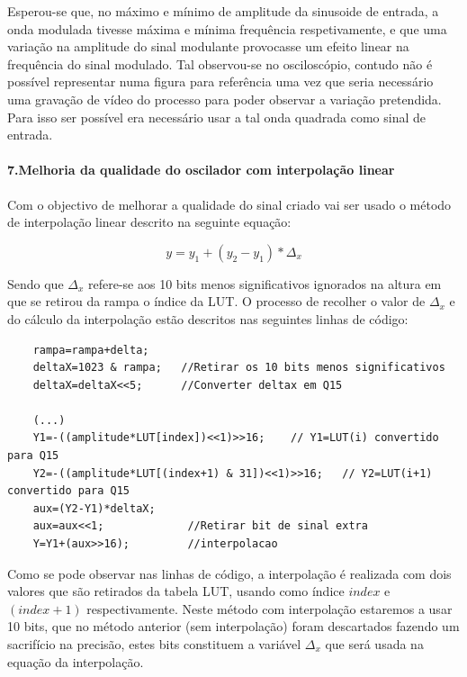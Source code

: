 \documentclass[11pt]{article}
\numberwithin{equation}{section}
\begin{document}
Esperou-se que, no máximo e mínimo de amplitude da sinusoide de entrada, a onda modulada tivesse máxima e mínima frequência respetivamente, e que uma variação na amplitude do sinal modulante provocasse um efeito linear na frequência do sinal modulado. Tal observou-se no osciloscópio, contudo não é possível representar numa figura para referência uma vez que seria necessário uma gravação de vídeo do processo para poder observar a variação pretendida. Para isso ser possível era necessário usar a tal onda quadrada como sinal de entrada.

\paragraph{7.Melhoria da qualidade do oscilador com interpolação linear} \hspace{0pt}

Com o objectivo de melhorar a qualidade do sinal criado vai ser usado o método de interpolação linear descrito na seguinte equação:

\begin{equation}
y=y_{1}+(y_{2}-y_{1})*\Delta_{x}
\end{equation}                       

Sendo que $ \Delta_{x} $ refere-se aos 10 bits menos significativos ignorados na altura em que se retirou da rampa o índice da LUT. O processo de recolher o valor de $ \Delta_{x} $ e do cálculo da interpolação estão descritos nas seguintes linhas de código:
\begin{lstlisting}
	rampa=rampa+delta;
	deltaX=1023 & rampa;   //Retirar os 10 bits menos significativos
	deltaX=deltaX<<5;      //Converter deltax em Q15

	(...)
	Y1=-((amplitude*LUT[index])<<1)>>16;	// Y1=LUT(i) convertido para Q15
	Y2=-((amplitude*LUT[(index+1) & 31])<<1)>>16;	// Y2=LUT(i+1) convertido para Q15
	aux=(Y2-Y1)*deltaX;		
	aux=aux<<1;				//Retirar bit de sinal extra
	Y=Y1+(aux>>16);			//interpolacao	
\end{lstlisting}

Como se pode observar nas linhas de código, a interpolação é realizada com dois valores que são retirados da tabela LUT, usando como índice $\textit{index}$ \hspace{0,1 mm} e $(\textit{index}+1)$ respectivamente. Neste método com interpolação estaremos a usar 10 bits, que no método anterior (sem interpolação) foram descartados fazendo um sacrifício na precisão,  estes bits constituem a variável $ \Delta_{x} $ que será usada na equação da interpolação.
                                            
\end{document}
